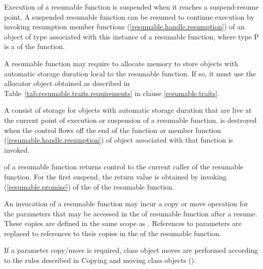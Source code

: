 \pnum
Execution of a resumable function is suspended when it reaches a suspend-resume point.
A suspended resumable function can be resumed
to continue execution by invoking
resumption member functions (\ref{resumable.handle.resumption}) of an object of  type
associated with this instance of a resumable function, where type P
is a  of the function. 

\pnum
A resumable function may require to allocate
memory to store objects with automatic storage duration
local to the resumable function. If so, it must
use the allocator object obtained as described in 
Table~\ref{tab:resumable.traits.requirements} in clause \ref{resumable.traits}.

\pnum
A  consist of 
storage for objects with automatic storage duration
that are live at the current point of execution or suspension of 
a resumable function.
 is destroyed when
the control flows off the end of the function or
 member function (\ref{resumable.handle.resumption}) of  object associated with that function is invoked.

\pnum 
{} of a resumable function returns control to the current
caller of the resumable function. For the first suspend, the return value is obtained by invoking
 (\ref{resumable.promise})
of the  of the resumable function.

\pnum
An invocation of a resumable function may incur a copy or move operation for the parameters that may be accessed in the 
of resumable function after a resume. These copies
are defined in the same scope as . 
References to parameters are replaced to 
references to their copies in the 
of the resumable function.

\pnum
If a parameter copy/move is required, class object moves are performed according to the rules described in Copying and moving class objects ().

%

